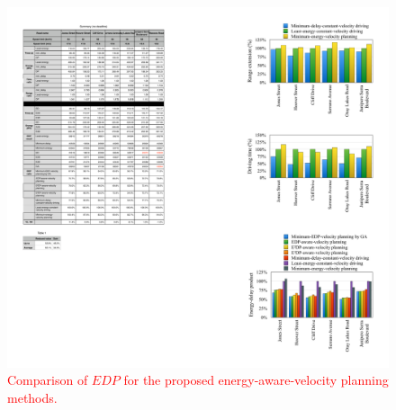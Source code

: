 \documentclass[onecolumn]{IEEEconf}
\begin{document}
\begin{description}
\begin{figure} [h!]
\centering
\renewcommand\thefigure{13}
\includegraphics[width=0.6\hsize]{Figures/EDP_comp_bar.pdf}
\caption{\textcolor{red}{Comparison of $EDP$ for the proposed energy-aware-velocity planning methods.}}
\label{fig:EDP_bar}
\end{figure} 

\end{description}
\newpage
~
\end{document}
